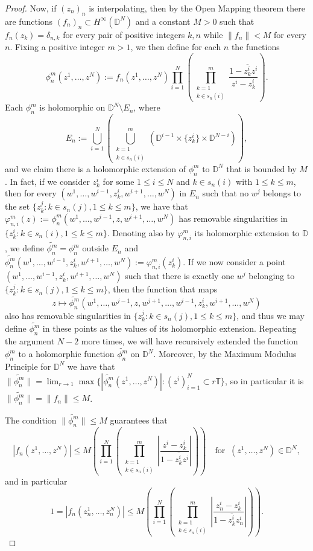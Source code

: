 \documentclass[10pt,a4paper]{amsart}
\newcommand{\D}{\mathbb{D}}
\newcommand{\T}{\mathbb{T}}
\begin{document}
\begin{proof}
Now, if $(z_n)_n$ is interpolating, then by the Open Mapping theorem there are functions $(f_n)_n\subset H^\infty(\D^N)$ and a constant $M>0$ such that $f_n(z_k)=\delta_{n,k}$ for every pair of positive integers $k,n$ while $\lVert f_n \rVert<M$ for every $n$. Fixing a positive integer $m>1$, we then define for each $n$ the functions 
\[
\phi_n^m(z^1,\dots,z^N):=f_n(z^1,\dots,z^N)\prod_{i=1}^N\left(\prod_{\substack{k=1\\k\in s_n(i)}}^m \frac{1-\overline{z_k^i}z^i}{z^i-z_k^i} \right).
\] 
Each $\phi_n^m$ is holomorphic on $\D^N\setminus E_n$, where 
\[
E_n:=\bigcup_{i=1}^N\left(\bigcup_{\substack{k=1\\k\in s_n(i)}}^m\left(\D^{i-1}\times\{z_k^i\}\times \D^{N-i}\right)\right),
\] 
and we claim there is a holomorphic extension of $\phi_n^m$ to $\D^N$ that is bounded by $M$. In fact, if we consider $z_k^i$ for some $1\leq i\leq N$ and $k\in s_n(i)$ with $1\leq k\leq m$, then for every $(w^1,\dots,w^{i-1},z_k^i,w^{i+1},\dots,w^N)$ in $E_n$ such that no $w^j$ belongs to the set $\{z_k^j : k\in s_n(j), 1\leq k\leq m\}$, we have that $\varphi_{n,i}^m(z):=\phi_n^m(w^1,\dots,w^{i-1},z,w^{i+1},\dots,w^N)$ has removable singularities in $\{z_k^i : k\in s_n(i), 1\leq k\leq m\}$. Denoting also by $\varphi_{n,i}^m$ its holomorphic extension to $\D$, we define $\widetilde{\phi_n^m}=\phi_n^m$ outside $E_n$ and $\widetilde{\phi_n^m}(w^1,\dots,w^{i-1},z_k^i,w^{i+1},\dots,w^N):=\varphi_{n,i}^m(z_k^i)$. If we now consider a point $(w^1,\dots,w^{i-1},z_k^i,w^{i+1},\dots,w^N)$ such that there is exactly one $w^j$ belonging to $\{z_k^j : k\in s_n(j), 1\leq k\leq m\}$, then the function that maps 
\[
z\mapsto\widetilde{\phi_n^m}(w^1,\dots,w^{j-1},z,w^{j+1},\dots,w^{i-1},z_k^i,w^{i+1},\dots,w^N)
\] 
also has removable singularities in $\{z_k^j : k\in s_n(j), 1\leq k\leq m\}$, and thus we may define $\widetilde{\phi_n^m}$ in these points as the values of its holomorphic extension. Repeating the argument $N-2$ more times, we will have recursively extended the function $\phi_n^m$ to a holomorphic function $\widetilde{\phi_n^m}$ on $\D^N$. Moreover, by the Maximum Modulus Principle for $\D^N$ we have that $\lVert\widetilde{\phi_n^m}\rVert=\lim_{r\to 1}\max\{|\widetilde{\phi_n^m}(z^1,\dots,z^N)|: (z^i)_{i=1}^N\subset r\T\}$, so in particular it is $\lVert\widetilde{\phi_n^m}\rVert=\lVert f_n\rVert\leq M$. 
    
The condition $\lVert\widetilde{\phi_n^m}\rVert\leq M$ guarantees that 
\[
|f_n(z^1,\dots,z^N)|\leq M \left(\prod_{i=1}^N\left(\prod_{\substack{k=1\\k\in s_n(i)}}^m \left|\frac{z^i-z_k^i}{1-\overline{z_k^i}z^i}\right| \right)\right)\quad \text{for }\ (z^1,\dots, z^N)\in\D^N,
\] 
and in particular 
\[
1=|f_n(z_n^1,\dots,z_n^N)|\leq M \left(\prod_{i=1}^N\left(\prod_{\substack{k=1\\k\in s_n(i)}}^m \left|\frac{z_n^i-z_k^i}{1-\overline{z_k^i}z_n^i}\right| \right)\right).
\] 


\end{proof}
\end{document}
